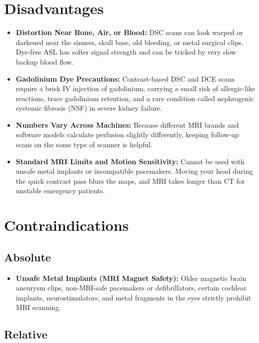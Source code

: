 \section{Disadvantages}

\begin{itemize}
    \item \textbf{Distortion Near Bone, Air, or Blood:} DSC scans can look warped or darkened near the sinuses, skull base, old bleeding, or metal surgical clips. Dye-free ASL has softer signal strength and can be tricked by very slow backup blood flow.
    \item \textbf{Gadolinium Dye Precautions:} Contrast-based DSC and DCE scans require a brisk IV injection of gadolinium, carrying a small risk of allergic-like reactions, trace gadolinium retention, and a rare condition called nephrogenic systemic fibrosis (NSF) in severe kidney failure.
    \item \textbf{Numbers Vary Across Machines:} Because different MRI brands and software models calculate perfusion slightly differently, keeping follow-up scans on the same type of scanner is helpful.
    \item \textbf{Standard MRI Limits and Motion Sensitivity:} Cannot be used with unsafe metal implants or incompatible pacemakers. Moving your head during the quick contrast pass blurs the maps, and MRI takes longer than CT for unstable emergency patients.
\end{itemize}

\section{Contraindications}

\subsection{Absolute}

\begin{itemize}
    \item \textbf{Unsafe Metal Implants (MRI Magnet Safety):} Older magnetic brain aneurysm clips, non-MRI-safe pacemakers or defibrillators, certain cochlear implants, neurostimulators, and metal fragments in the eyes strictly prohibit MRI scanning.
\end{itemize}

\subsection{Relative}

